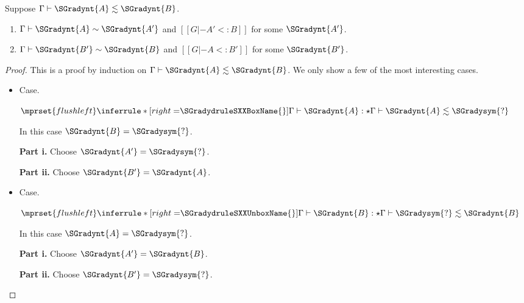 \begin{lemma}
  \label{lemma:consistent-subtyping-1}
  Suppose $ \Gamma  \vdash  \SGradynt{A}  \lesssim  \SGradynt{B} $.
  \begin{enumerate}[label=\roman*., align=left]
  \item $ \Gamma  \vdash  \SGradynt{A}  \sim  \SGradynt{A'} $ and $[[G |- A' <: B]]$ for some $\SGradynt{A'}$.
  \item $ \Gamma  \vdash  \SGradynt{B'}  \sim  \SGradynt{B} $ and $[[G |- A <: B']]$ for some $\SGradynt{B'}$.
  \end{enumerate}
\end{lemma}
\begin{proof}
  This is a proof by induction on $ \Gamma  \vdash  \SGradynt{A}  \lesssim  \SGradynt{B} $.  We only show a
  few of the most interesting cases.
  \begin{itemize}
  \item[] Case.\ \\ 
    \begin{center}
      \begin{math}
        $$\mprset{flushleft}
        \inferrule* [right=$\SGradydruleSXXBoxName{}$] {
           \Gamma  \vdash  \SGradynt{A}  : \star 
        }{ \Gamma  \vdash  \SGradynt{A}  \lesssim  \SGradysym{\mbox{?}} }
      \end{math}
    \end{center}
    In this case $\SGradynt{B} = \SGradysym{\mbox{?}}$.

    \noindent
    \textbf{Part i.} Choose $\SGradynt{A'} = \SGradysym{\mbox{?}}$.

    \noindent
    \textbf{Part ii.} Choose $\SGradynt{B'} = \SGradynt{A}$.

  \item[] Case.\ \\ 
    \begin{center}
      \begin{math}
        $$\mprset{flushleft}
        \inferrule* [right=$\SGradydruleSXXUnboxName{}$] {
           \Gamma  \vdash  \SGradynt{B}  : \star 
        }{ \Gamma  \vdash  \SGradysym{\mbox{?}}  \lesssim  \SGradynt{B} }
      \end{math}
    \end{center}
    In this case $\SGradynt{A} = \SGradysym{\mbox{?}}$.

    \noindent
    \textbf{Part i.} Choose $\SGradynt{A'} = \SGradynt{B}$.

    \noindent
    \textbf{Part ii.} Choose $\SGradynt{B'} = \SGradysym{\mbox{?}}$.


\end{itemize}
\end{proof}
